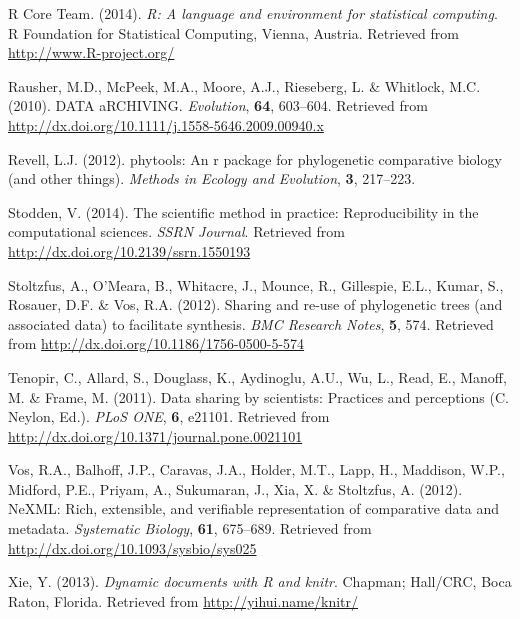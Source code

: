 \documentclass[author-year, review, 11pt]{components/elsarticle} %
\begin{document}
R Core Team. (2014). \emph{R: A language and environment for statistical
computing}. R Foundation for Statistical Computing, Vienna, Austria.
Retrieved from \url{http://www.R-project.org/}

Rausher, M.D., McPeek, M.A., Moore, A.J., Rieseberg, L. \& Whitlock,
M.C. (2010). DATA aRCHIVING. \emph{Evolution}, \textbf{64}, 603--604.
Retrieved from \url{http://dx.doi.org/10.1111/j.1558-5646.2009.00940.x}

Revell, L.J. (2012). phytools: An r package for phylogenetic comparative
biology (and other things). \emph{Methods in Ecology and Evolution},
\textbf{3}, 217--223.

Stodden, V. (2014). The scientific method in practice: Reproducibility
in the computational sciences. \emph{SSRN Journal}. Retrieved from
\url{http://dx.doi.org/10.2139/ssrn.1550193}

Stoltzfus, A., O'Meara, B., Whitacre, J., Mounce, R., Gillespie, E.L.,
Kumar, S., Rosauer, D.F. \& Vos, R.A. (2012). Sharing and re-use of
phylogenetic trees (and associated data) to facilitate synthesis.
\emph{BMC Research Notes}, \textbf{5}, 574. Retrieved from
\url{http://dx.doi.org/10.1186/1756-0500-5-574}

Tenopir, C., Allard, S., Douglass, K., Aydinoglu, A.U., Wu, L., Read,
E., Manoff, M. \& Frame, M. (2011). Data sharing by scientists:
Practices and perceptions (C. Neylon, Ed.). \emph{PLoS ONE}, \textbf{6},
e21101. Retrieved from
\url{http://dx.doi.org/10.1371/journal.pone.0021101}

Vos, R.A., Balhoff, J.P., Caravas, J.A., Holder, M.T., Lapp, H.,
Maddison, W.P., Midford, P.E., Priyam, A., Sukumaran, J., Xia, X. \&
Stoltzfus, A. (2012). NeXML: Rich, extensible, and verifiable
representation of comparative data and metadata. \emph{Systematic
Biology}, \textbf{61}, 675--689. Retrieved from
\url{http://dx.doi.org/10.1093/sysbio/sys025}

Xie, Y. (2013). \emph{Dynamic documents with R and knitr}. Chapman;
Hall/CRC, Boca Raton, Florida. Retrieved from
\url{http://yihui.name/knitr/}
\end{document}
